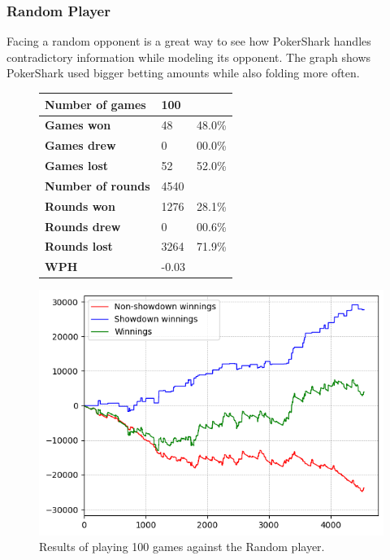 \subsubsection{Random Player}
Facing a random opponent is a great way to see how PokerShark handles contradictory information while modeling its opponent. The graph shows PokerShark used bigger betting amounts while also folding more often. 

\begin{figure}[H]
    \centering
    \begin{minipage}{\textwidth}
        \begin{minipage}{0.40\textwidth}
            \begin{tabular}{|l|l|l|}
                \hline
                \textbf{Number of games}  & 100   &        \\ \hline
                \textbf{Games won}        & 48    & 48.0\% \\ \hline
                \textbf{Games drew}       & 0     & 00.0\%  \\ \hline
                \textbf{Games lost}       & 52    & 52.0\% \\ \hline
                \textbf{Number of rounds} & 4540  &        \\ \hline
                \textbf{Rounds won}       & 1276  & 28.1\% \\ \hline
                \textbf{Rounds drew}      & 0     & 00.6\%  \\ \hline
                \textbf{Rounds lost}      & 3264  & 71.9\% \\ \hline
                \textbf{WPH}              & -0.03  &        \\ \hline
            \end{tabular}
        \end{minipage}
        \hspace{0.05\textwidth}
        \begin{minipage}{0.5\textwidth}
            \includegraphics[width=\textwidth]{graphics/random.png}
        \end{minipage}
    \end{minipage}
    \caption{Results of playing 100 games against the Random player.}
\end{figure}

